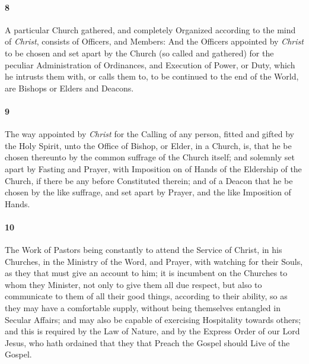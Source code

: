 \documentclass[
    paper=letterpaper,
    11pt,
    twoside,
    DIV=calc,
    openany
]{scrbook}
\begin{document}
\paragraph{8} %
A particular Church gathered, and completely Organized according to the mind of \textit{Christ}, consists of Officers, and Members: And the Officers appointed by \textit{Christ} to be chosen and set apart by the Church (so called and gathered) for the peculiar Administration of Ordinances, and Execution of Power, or Duty, which he intrusts them with, or calls them to, to be continued to the end of the World, are \R{}Bishops or Elders and Deacons.

\footnotebegin
{}
\footnoteend

\paragraph{9} %
The way appointed by \textit{Christ} for the Calling of any person, fitted and gifted by the Holy Spirit, unto the Office of Bishop, or Elder, in a Church, is, that he be chosen thereunto by the common \R{}suffrage of the Church itself; and solemnly set apart by Fasting and Prayer, with Imposition on of Hands of the \R{}Eldership of the Church, if there be any before Constituted therein; and of a Deacon \R{}that he be chosen by the like suffrage, and set apart by Prayer, and the like Imposition of Hands.

\footnotebegin
{}
\footnoteend
\pagebreak
\paragraph{10} %
The Work of Pastors being constantly to attend the Service of Christ, in his Churches, in the Ministry of the Word, and Prayer, \R{}with watching for their Souls, as they that must give an account to him; it is incumbent on the Churches to whom they Minister, not only to give them all due respect, \R{}but also to communicate to them of all their good things, according to their ability, so as they may have a comfortable supply, without being themselves \R{}entangled in Secular Affairs; and may also be capable of exercising \R{}Hospitality towards others; and this is required by the \R{}Law of Nature, and by the Express Order of our Lord Jesus, who hath ordained that they that Preach the Gospel should Live of the Gospel.

\footnotebegin
{}
\footnoteend
\end{document}
